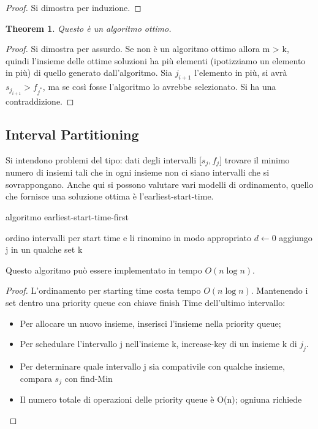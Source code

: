\documentclass{article}
\newtheorem{theorem}{Theorem}[subsection]
\begin{document}
\begin{proof}
Si dimostra per induzione.
\end{proof}
\begin{theorem}
Questo è un algoritmo ottimo.
\end{theorem}
\begin{proof}
Si dimostra per assurdo. Se non è un algoritmo ottimo allora m > k, quindi l'insieme delle ottime soluzioni ha più elementi (ipotizziamo un elemento in più) di quello generato dall'algoritmo. Sia $j_{i+1}$ l'elemento in più, si avrà  $s_{j_{i+1}} > f_{j^*}$, ma se così fosse l'algoritmo lo avrebbe selezionato. Si ha una contraddizione.
\end{proof}
\newpage
\subsection{Interval Partitioning}
Si intendono problemi del tipo: dati degli intervalli [$s_j, f_j$] trovare il minimo numero di insiemi tali che in ogni insieme non ci siano intervalli che si sovrappongano. Anche qui si possono valutare vari modelli di ordinamento, quello che fornisce una soluzione ottima è l'earliest-start-time.
\begin{center}
\begin{algorithm}
\caption{algoritmo earliest-start-time-first}
ordino intervalli per start time e li rinomino in modo appropriato\;
$d \gets 0$\;
    {
    {aggiungo j in un qualche set k}
    }
\end{algorithm}
\end{center}
Questo algoritmo può essere implementato in tempo $O(n \log{n})$.
\begin{proof}
    L'ordinamento per starting time costa tempo $O(n \log{n})$.
    Mantenendo i set dentro una priority queue con chiave finish Time dell'ultimo intervallo:
    \begin{itemize}
        \item Per allocare un nuovo insieme, inserisci l'insieme nella priority queue;
        \item Per schedulare l'intervallo j nell'insieme k,  increase-key di un insieme k di $j_j$.
        \item Per determinare quale intervallo j sia compativile con qualche insieme, compara $s_j$ con find-Min
        \item Il numero totale di operazioni delle priority queue è  O(n); ogniuna richiede 
    \end{itemize}
\end{proof}
\end{document}
